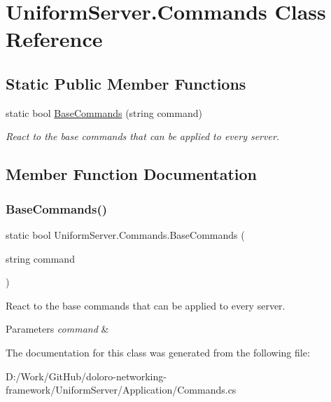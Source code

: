 \hypertarget{class_uniform_server_1_1_commands}{}\section{Uniform\+Server.\+Commands Class Reference}
\label{class_uniform_server_1_1_commands}
\subsection*{Static Public Member Functions}
\begin{DoxyCompactItemize}
\item 
static bool \mbox{\hyperlink{class_uniform_server_1_1_commands_ad1bac97da40d03e97f9b5fe7ed152ef9}{Base\+Commands}} (string command)
\begin{DoxyCompactList}\small\item\em React to the base commands that can be applied to every server. \end{DoxyCompactList}\end{DoxyCompactItemize}


\subsection{Member Function Documentation}
\mbox{\label{class_uniform_server_1_1_commands_ad1bac97da40d03e97f9b5fe7ed152ef9}} 
\subsubsection{\texorpdfstring{Base\+Commands()}{BaseCommands()}}
{\footnotesize\ttfamily static bool Uniform\+Server.\+Commands.\+Base\+Commands (\begin{DoxyParamCaption}\item[{string}]{command }\end{DoxyParamCaption})\hspace{0.3cm}{\ttfamily [static]}}



React to the base commands that can be applied to every server. 


\begin{DoxyParams}{Parameters}
{\em command} & \\
\hline
\end{DoxyParams}


The documentation for this class was generated from the following file\+:\begin{DoxyCompactItemize}
\item 
D\+:/\+Work/\+Git\+Hub/doloro-\/networking-\/framework/\+Uniform\+Server/\+Application/Commands.\+cs\end{DoxyCompactItemize}
